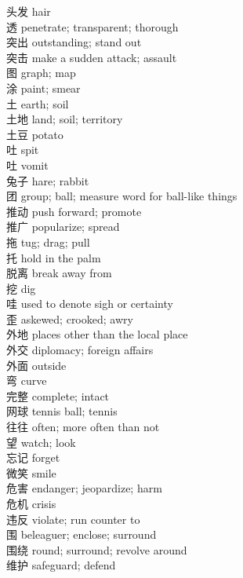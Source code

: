 头发 \quad hair\\
透 \quad penetrate; transparent; thorough\\
突出 \quad outstanding; stand out\\
突击 \quad make a sudden attack; assault\\
图 \quad graph; map\\
涂 \quad paint; smear\\
土 \quad earth; soil\\
土地 \quad land; soil; territory\\
土豆 \quad potato\\
吐 \quad spit\\
吐 \quad vomit\\
兔子 \quad hare; rabbit\\
团 \quad group; ball; measure word for ball-like things\\
推动 \quad push forward; promote\\
推广 \quad popularize; spread\\
拖 \quad tug; drag; pull\\
托 \quad hold in the palm\\
脱离 \quad break away from\\
挖 \quad dig\\
哇 \quad used to denote sigh or certainty\\
歪 \quad askewed; crooked; awry\\
外地 \quad places other than the local place\\
外交 \quad diplomacy; foreign affairs\\
外面 \quad outside\\
弯 \quad curve\\
完整 \quad complete; intact\\
网球 \quad tennis ball; tennis\\
往往 \quad often; more often than not\\
望 \quad watch; look\\
忘记 \quad forget\\
微笑 \quad smile\\
危害 \quad endanger; jeopardize; harm\\
危机 \quad crisis\\
违反 \quad violate; run counter to\\
围 \quad beleaguer; enclose; surround\\
围绕 \quad round; surround; revolve around\\
维护 \quad safeguard; defend\\
